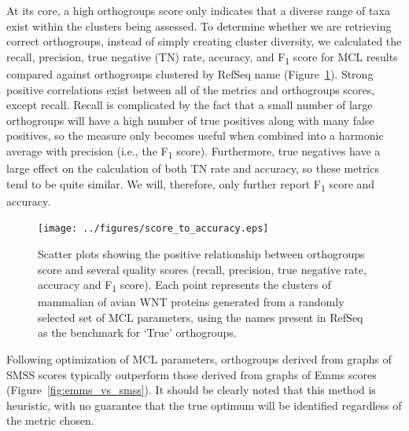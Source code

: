 \documentclass[twocolumn]{bmcart}  %
\begin{document}
At its core, a high orthogroups score only indicates that a diverse range of taxa exist within the clusters being assessed.
To determine whether we are retrieving correct orthogroups, instead of simply creating cluster diversity, we calculated the recall, precision, true negative (TN) rate, accuracy, and F\textsubscript{1} score for MCL results compared against orthogroups clustered by RefSeq name (Figure~\ref{fig:score_to_accuracy}).
Strong positive correlations exist between all of the metrics and orthogroups scores, except recall.
Recall is complicated by the fact that a small number of large orthogroups will have a high number of true positives along with many false positives, so the measure only becomes useful when combined into a harmonic average with precision (i.e., the F\textsubscript{1} score).
Furthermore, true negatives have a large effect on the calculation of both TN rate and accuracy, so these metrics tend to be quite similar.
We will, therefore, only further report F\textsubscript{1} score and accuracy.

\begin{figure}[t]
  \begin{center}
  \texttt{[image: ../figures/score\_to\_accuracy.eps]}
\end{center}
\caption{Scatter plots showing the positive relationship between orthogroups score and several quality scores (recall, precision, true negative rate, accuracy and F\textsubscript{1} score). Each point represents the clusters of mammalian of avian WNT proteins generated from a randomly selected set of MCL parameters, using the names present in RefSeq as the benchmark for `True' orthogroups.}
\label{fig:score_to_accuracy}
\end{figure}


Following optimization of MCL parameters, orthogroups derived from graphs of SMSS scores typically outperform those derived from graphs of Emms scores (Figure~\ref{fig:emms_vs_smss}).
It should be clearly noted that this method is heuristic, with no guarantee that the true optimum will be identified regardless of the metric chosen.
\end{document}
